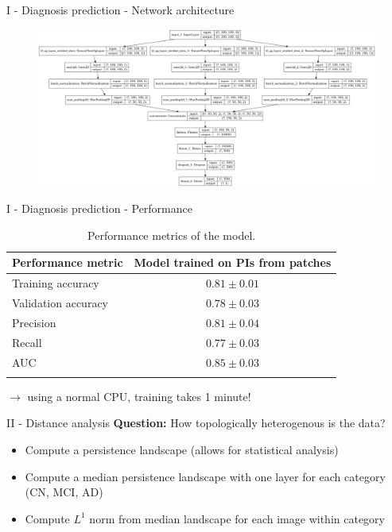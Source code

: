 \documentclass[aspectratio=169, 10pt, dvipsnames]{beamer}
\begin{document}
\begin{frame}[fragile]{I - Diagnosis prediction - Network architecture}
  \begin{figure}
    \centering
    \includegraphics[width=\textwidth]{figures/model.png}
  \end{figure}
\end{frame}


\begin{frame}[fragile]{I - Diagnosis prediction - Performance}
\begin{table}
  \centering
  \begin{tabular}{lc}
    \toprule
    \textbf{Performance metric} & \textbf{Model trained on PIs from patches}\\
    \midrule
    Training accuracy & $0.81\pm 0.01$  \\
    Validation accuracy & $0.78\pm 0.03$  \\
    Precision & $0.81\pm 0.04$  \\
    Recall & $0.77\pm 0.03$  \\
    AUC & $0.85\pm 0.03$  \\
    \bottomrule
    \vspace{1pt}
  \end{tabular}
  \caption{Performance metrics of the model.}
  \label{tab:performance}
\end{table}
$\rightarrow$ using a normal CPU, training  takes 1 minute!
\end{frame}

\begin{frame}[fragile]{II - Distance analysis}
\textbf{Question:} How topologically heterogenous is the data?
  \begin{itemize}
  \item Compute a persistence landscape (allows for statistical analysis)
  \item Compute a median persistence landscape with one layer for each category (CN, MCI, AD)
  \item Compute $L^1$ norm from median landscape for each image within category
  \end{itemize}
\end{frame}
\end{document}
